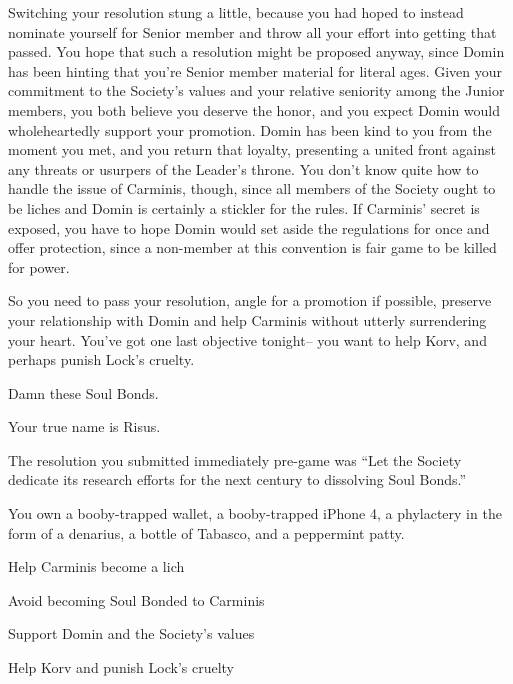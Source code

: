 \documentclass[char]{Sel}
\begin{document}
Switching your resolution stung a little, because you had hoped to instead nominate yourself for Senior member and throw all your effort into getting that passed. You hope that such a resolution might be proposed anyway, since Domin has been hinting that you're Senior member material for literal ages. Given your commitment to the Society's values and your relative seniority among the Junior members, you both believe you deserve the honor, and you expect Domin would wholeheartedly support your promotion.
Domin has been kind to you from the moment you met, and you return that loyalty, presenting a united front against any threats or usurpers of the Leader’s throne. You don't know quite how to handle the issue of Carminis, though, since all members of the Society ought to be liches and Domin is certainly a stickler for the rules. If Carminis' secret is exposed, you have to hope Domin would set aside the regulations for once and offer protection, since a non-member at this convention is fair game to be killed for power.

So you need to pass your resolution, angle for a promotion if possible, preserve your relationship with Domin and help Carminis without utterly surrendering your heart. You’ve got one last objective tonight-- you want to help Korv, and perhaps punish Lock's cruelty.

Damn these Soul Bonds.


\begin{itemz}[Notes]
  \item Your true name is Risus.
  \item The resolution you submitted immediately pre-game was ``Let the Society dedicate its research efforts for the next century to dissolving Soul Bonds.''
   \item You own a booby-trapped wallet, a booby-trapped iPhone 4, a phylactery in the form of a denarius, a bottle of Tabasco, and a peppermint patty.
    \end{itemz}
    
  
 \begin{itemz}[Goals]
\item Help Carminis become a lich
\item Avoid becoming Soul Bonded to Carminis
\item Support Domin and the Society's values
\item Help Korv and punish Lock's cruelty
\end{itemz}
\end{document}
